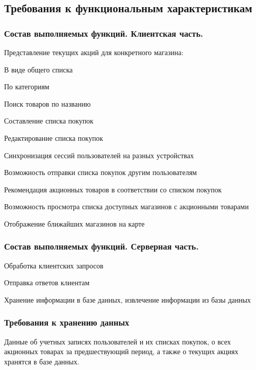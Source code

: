 \subsection{Требования к функциональным характеристикам}

\subsubsection{Состав выполняемых функций. Клиентская часть.}
\begin{my_enumerate}
\item Представление текущих акций для конкретного магазина:
    \begin{my_enumerate}
    \item В виде общего списка
    \item По категориям
    \end{my_enumerate}
\item Поиск товаров по названию
\item Составление списка покупок
\item Редактирование списка покупок
\item Синхронизация сессий пользователей на разных устройствах
\item Возможность отправки списка покупок другим пользователям
\item Рекомендация акционных товаров в соответствии со списком покупок
\item Возможность просмотра списка доступных магазинов с акционными товарами
\item Отображение ближайших магазинов на карте
\end{my_enumerate}

\subsubsection{Состав выполняемых функций. Серверная часть.}
\begin{my_enumerate}
\item Обработка клиентских запросов
\item Отправка ответов клиентам
\item Хранение информации в базе данных, 
извлечение информации из базы данных
\end{my_enumerate}

\subsubsection{Требования к хранению данных}
Данные об учетных записях пользователей и их списках покупок,
о всех акционных товарах за предшествующий период,
а также о текущих акциях
хранятся в базе данных.

